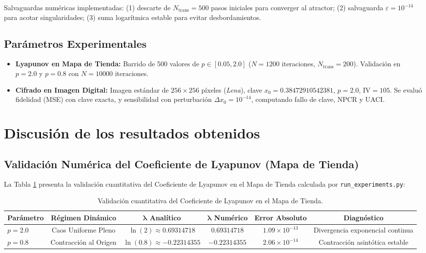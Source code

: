 \documentclass[11pt,letterpaper]{article}
\begin{document}
Salvaguardas numéricas implementadas: (1) descarte de $N_{\text{trans}} = 500$ pasos iniciales para converger al atractor; (2) salvaguarda $\varepsilon = 10^{-14}$ para acotar singularidades; (3) suma logarítmica estable para evitar desbordamientos.

\subsection{Parámetros Experimentales}
\begin{itemize}
    \item \textbf{Lyapunov en Mapa de Tienda:} Barrido de 500 valores de $p \in [0.05, 2.0]$ ($N = 1200$ iteraciones, $N_{\text{trans}} = 200$). Validación en $p=2.0$ y $p=0.8$ con $N = 10000$ iteraciones.
    \item \textbf{Cifrado en Imagen Digital:} Imagen estándar de $256 \times 256$ píxeles (\textit{Lena}), clave $x_0 = 0.38472910542381$, $p = 2.0$, $\text{IV} = 105$. Se evaluó fidelidad (MSE) con clave exacta, y sensibilidad con perturbación $\Delta x_0 = 10^{-14}$, computando fallo de clave, NPCR y UACI.
\end{itemize}

\section{Discusión de los resultados obtenidos}

\subsection{Validación Numérica del Coeficiente de Lyapunov (Mapa de Tienda)}
La Tabla \ref{tab:benchmarks_tent} presenta la validación cuantitativa del Coeficiente de Lyapunov en el Mapa de Tienda calculada por \texttt{run\_experiments.py}:

\begin{table}[H]
\centering
\caption{Validación cuantitativa del Coeficiente de Lyapunov en el Mapa de Tienda.}
\label{tab:benchmarks_tent}
\small
\begin{tabularx}{\textwidth}{lccccc}
\toprule
\textbf{Parámetro} & \textbf{Régimen Dinámico} & $\boldsymbol{\lambda}$ \textbf{Analítico} & $\boldsymbol{\lambda}$ \textbf{Numérico} & \textbf{Error Absoluto} & \textbf{Diagnóstico} \\
\midrule
$p = 2.0$ & Caos Uniforme Pleno & $\ln(2) \approx 0.69314718$ & $0.69314718$ & $1.09 \times 10^{-13}$ & Divergencia exponencial continua \\
$p = 0.8$ & Contracción al Origen & $\ln(0.8) \approx -0.22314355$ & $-0.22314355$ & $2.06 \times 10^{-14}$ & Contracción asintótica estable \\
\bottomrule
\end{tabularx}
\end{table}
\end{document}
